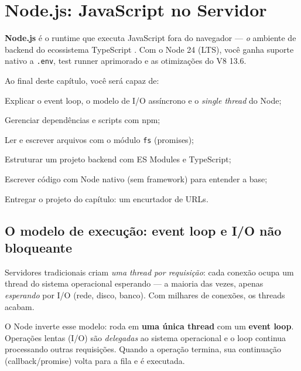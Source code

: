 \chapter{Node.js: JavaScript no Servidor}
\label{cap:node}

\begin{caixaconceito}
\textbf{Node.js} é o runtime que executa JavaScript fora do navegador —
\emph{o} ambiente de backend do ecossistema TypeScript \cite{node-docs,node24}.
Com o Node 24 (LTS), você ganha suporte nativo a \texttt{.env}, test runner
aprimorado e as otimizações do V8 13.6.
\end{caixaconceito}

Ao final deste capítulo, você será capaz de:
\begin{objetivos}
  \item Explicar o event loop, o modelo de I/O assíncrono e o \emph{single thread} do Node;
  \item Gerenciar dependências e scripts com npm;
  \item Ler e escrever arquivos com o módulo \texttt{fs} (promises);
  \item Estruturar um projeto backend com ES Modules e TypeScript;
  \item Escrever código com Node nativo (sem framework) para entender a base;
  \item Entregar o projeto do capítulo: um encurtador de URLs.
\end{objetivos}

\section{O modelo de execução: event loop e I/O não bloqueante}

Servidores tradicionais criam \emph{uma thread por requisição}: cada conexão
ocupa um thread do sistema operacional esperando — a maioria das vezes, apenas
\emph{esperando} por I/O (rede, disco, banco). Com milhares de conexões, os
threads acabam.

O Node inverte esse modelo: roda em \textbf{uma única thread} com um
\textbf{event loop}. Operações lentas (I/O) são \emph{delegadas} ao sistema
operacional e o loop continua processando outras requisições. Quando a
operação termina, sua continuação (callback/promise) volta para a fila e é
executada.

